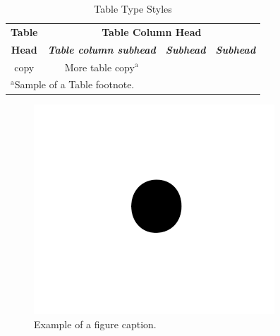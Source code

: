 \documentclass[conference]{IEEEtran}
\begin{document}
\begin{table}[htbp]
\caption{Table Type Styles}
\begin{center}
\begin{tabular}{|c|c|c|c|}
\hline
\textbf{Table}&\multicolumn{3}{|c|}{\textbf{Table Column Head}} \\
\cline{2-4} 
\textbf{Head} & \textbf{\textit{Table column subhead}}& \textbf{\textit{Subhead}}& \textbf{\textit{Subhead}} \\
\hline
copy& More table copy$^{\mathrm{a}}$& &  \\
\hline
\multicolumn{4}{l}{$^{\mathrm{a}}$Sample of a Table footnote.}
\end{tabular}
\label{tab1}
\end{center}
\end{table}

\begin{figure}[htbp]
\centerline{\includegraphics{fig1.png}}
\caption{Example of a figure caption.}
\label{fig}
\end{figure}
\end{document}
